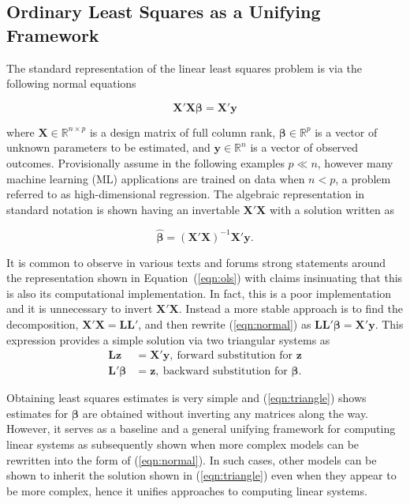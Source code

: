 \documentclass[12pt]{article}
\begin{document}
\subsection*{Ordinary Least Squares as a Unifying Framework}

The standard representation of the linear least squares problem is via the following normal equations \cite{mcandsearle:2001}   

\begin{equation}
\label{eqn:normal}
\bm{X'X\beta} = \bm{X'y}
\end{equation}

\noindent where $\bm{X}\in\mathbb{R}^{n \times p}$ is a design matrix of full column rank, $\bm{\beta} \in \mathbb{R}^p$ is a vector of unknown parameters to be estimated, and $\bm{y} \in \mathbb{R}^n$ is a vector of observed outcomes. Provisionally assume in the following examples $p \ll n$, however many machine learning (ML) applications are trained on data when $n < p$, a problem referred to as high-dimensional regression. The algebraic representation in standard notation is shown having an invertable $\bm{X'X}$ with a solution written as

\begin{equation}
\label{eqn:ols}
\widehat{\bm{\beta}} = \bm{(X'X)}^{-1} \bm{X'y}.
\end{equation}

It is common to observe in various texts and forums strong statements around the representation shown in Equation~(\ref{eqn:ols}) with claims insinuating that this is also its computational implementation. In fact, this is a poor implementation and it is unnecessary to invert $\bm{X'X}$. Instead a more stable approach is to find the decomposition, $\bm{X'X} = \bm{LL'}$, and then rewrite (\ref{eqn:normal}) as $\bm{LL'\beta} = \bm{X'y}$. This expression provides a simple solution via two triangular systems as
\begin{align}
\label{eqn:triangle}
\bm{Lz}  & =  \bm{X'y}, \ \text{forward substitution for $\bm{z}$}\\
\bm{L'\beta}  &=  \bm{z}, \ \text{backward substitution for $\bm{\beta}$} \nonumber.  
\end{align}

Obtaining least squares estimates is very simple and (\ref{eqn:triangle}) shows estimates for $\bm{\beta}$ are obtained without inverting any matrices along the way. However, it serves as a baseline and a general unifying framework for computing linear systems as subsequently shown when more complex models can be rewritten into the form of (\ref{eqn:normal}). In such cases, other models can be shown to inherit the solution shown in (\ref{eqn:triangle}) even when they appear to be more complex, hence it unifies approaches to computing linear systems.
\end{document}
